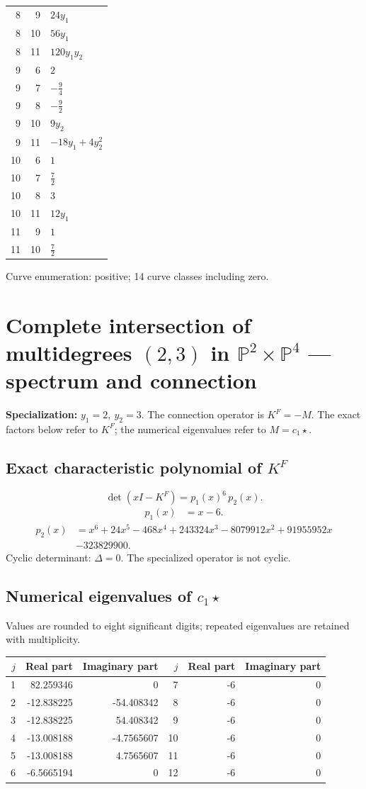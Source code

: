 \documentclass[10pt,a4paper]{article}
\begin{document}
{\begin{longtable}{rrp{125mm}}
8 & 9 & $24 y_{1}$\\
8 & 10 & $56 y_{1}$\\
8 & 11 & $120 y_{1} y_{2}$\\
9 & 6 & $2$\\
9 & 7 & $- \frac{9}{4}$\\
9 & 8 & $- \frac{9}{2}$\\
9 & 10 & $9 y_{2}$\\
9 & 11 & $- 18 y_{1} + 4 y_{2}^{2}$\\
10 & 6 & $1$\\
10 & 7 & $\frac{7}{2}$\\
10 & 8 & $3$\\
10 & 11 & $12 y_{1}$\\
11 & 9 & $1$\\
11 & 10 & $\frac{7}{2}$\\
\end{longtable}}
Curve enumeration: positive; 14 curve classes including zero.
\clearpage\section*{Complete intersection of multidegrees $(2,3)$ in $\mathbb P^{2}\times \mathbb P^{4}$ --- spectrum and connection}
\textbf{Specialization:} $y_1=2,\ y_2=3$. The connection operator is $K^F=-M$. The exact factors below refer to $K^F$; the numerical eigenvalues refer to $M=c_1\star$.
\subsection*{Exact characteristic polynomial of $K^F$}
\[\det(xI-K^F)=p_{1}(x)^{6}\,p_{2}(x).\]
\[\begin{aligned}p_{1}(x)&=x - 6.\end{aligned}\]
\[\begin{aligned}p_{2}(x)&=x^{6} + 24 x^{5} - 468 x^{4} + 243324 x^{3} - 8079912 x^{2} + 91955952 x\\&-323829900.\end{aligned}\]
Cyclic determinant: $\Delta=0$. The specialized operator is not cyclic.
\subsection*{Numerical eigenvalues of $c_1\star$}
Values are rounded to eight significant digits; repeated eigenvalues are retained with multiplicity.
\begin{center}\small\begin{tabular}{rrr@{\qquad}rrr}\toprule $j$ & Real part & Imaginary part & $j$ & Real part & Imaginary part\\\midrule
1 & 82.259346 & 0 & 7 & -6 & 0\\
2 & -12.838225 & -54.408342 & 8 & -6 & 0\\
3 & -12.838225 & 54.408342 & 9 & -6 & 0\\
4 & -13.008188 & -4.7565607 & 10 & -6 & 0\\
5 & -13.008188 & 4.7565607 & 11 & -6 & 0\\
6 & -6.5665194 & 0 & 12 & -6 & 0\\
\bottomrule\end{tabular}\end{center}
\end{document}
